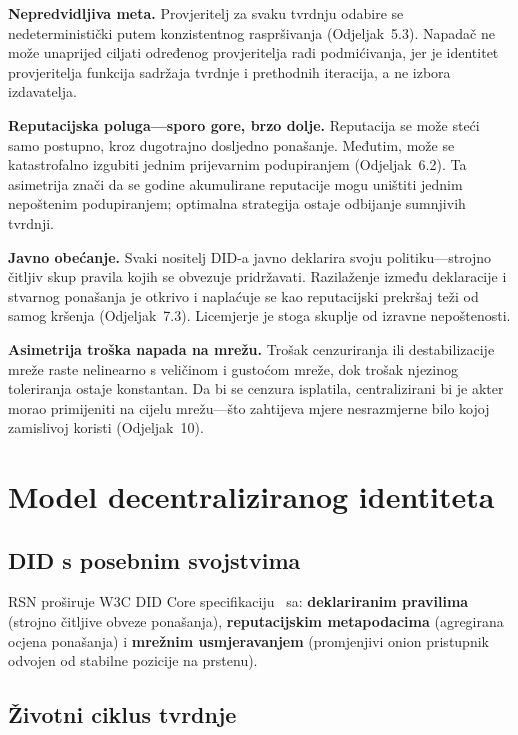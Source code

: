 \documentclass[11pt,a4paper,twocolumn]{article}
\begin{document}
\textbf{Nepredvidljiva meta.} Provjeritelj za svaku tvrdnju odabire se nedeterministički putem konzistentnog raspršivanja (Odjeljak~5.3). Napadač ne može unaprijed ciljati određenog provjeritelja radi podmićivanja, jer je identitet provjeritelja funkcija sadržaja tvrdnje i prethodnih iteracija, a ne izbora izdavatelja.

\textbf{Reputacijska poluga---sporo gore, brzo dolje.} Reputacija se može steći samo postupno, kroz dugotrajno dosljedno ponašanje. Međutim, može se katastrofalno izgubiti jednim prijevarnim podupiranjem (Odjeljak~6.2). Ta asimetrija znači da se godine akumulirane reputacije mogu uništiti jednim nepoštenim podupiranjem; optimalna strategija ostaje odbijanje sumnjivih tvrdnji.

\textbf{Javno obećanje.} Svaki nositelj DID-a javno deklarira svoju politiku---strojno čitljiv skup pravila kojih se obvezuje pridržavati. Razilaženje između deklaracije i stvarnog ponašanja je otkrivo i naplaćuje se kao reputacijski prekršaj teži od samog kršenja (Odjeljak~7.3). Licemjerje je stoga skuplje od izravne nepoštenosti.

\textbf{Asimetrija troška napada na mrežu.} Trošak cenzuriranja ili destabilizacije mreže raste nelinearno s veličinom i gustoćom mreže, dok trošak njezinog toleriranja ostaje konstantan. Da bi se cenzura isplatila, centralizirani bi je akter morao primijeniti na cijelu mrežu---što zahtijeva mjere nesrazmjerne bilo kojoj zamislivoj koristi (Odjeljak~10).

\section{Model decentraliziranog identiteta}

\subsection{DID s posebnim svojstvima}

RSN proširuje W3C DID Core specifikaciju~\cite{did2022} sa: \textbf{deklariranim pravilima} (strojno čitljive obveze ponašanja), \textbf{reputacijskim metapodacima} (agregirana ocjena ponašanja) i \textbf{mrežnim usmjeravanjem} (promjenjivi onion pristupnik odvojen od stabilne pozicije na prstenu).

\subsection{Životni ciklus tvrdnje}
\end{document}
